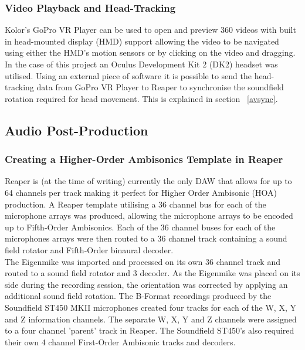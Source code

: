 			\subsubsection{Video Playback and Head-Tracking}
				 Kolor's GoPro VR Player \cite{GoProVR} can be used to open and preview 360 videos with built in head-mounted display (HMD) support allowing the video to be navigated using either the HMD's motion sensors or by clicking on the video and dragging. In the case of this project an Oculus Development Kit 2 (DK2) \cite{OculusDK2} headset was utilised. Using an external piece of software it is possible to send the head-tracking data from GoPro VR Player to Reaper to synchronise the soundfield rotation required for head movement. This is explained in section ~\ref{avsync}.


		\subsection{Audio Post-Production}
			
			\subsubsection{Creating a Higher-Order Ambisonics Template in Reaper}

				Reaper \cite{Reaper} is (at the time of writing) currently the only DAW that allows for up to 64 channels per track making it perfect for Higher Order Ambisonic (HOA) production. A Reaper template utilising a 36 channel bus for each of the microphone arrays was produced, allowing the microphone arrays to be encoded up to Fifth-Order Ambisonics. Each of the 36 channel buses for each of the microphones arrays were then routed to a 36 channel track containing a sound field rotator and Fifth-Order binaural decoder. \\
				
				The Eigenmike was imported and processed on its own 36 channel track and routed to a sound field rotator and 3 decoder. As the Eigenmike was placed on its side during the recording session, the orientation was corrected by applying an additional sound field rotation.
				The B-Format recordings produced by the Soundfield ST450 MKII microphones created four tracks for each of the W, X, Y and Z information channels. The separate W, X, Y and Z channels were assigned to a four channel 'parent' track in Reaper. The Soundfield ST450's also required their own 4 channel First-Order Ambisonic tracks and decoders.\\

